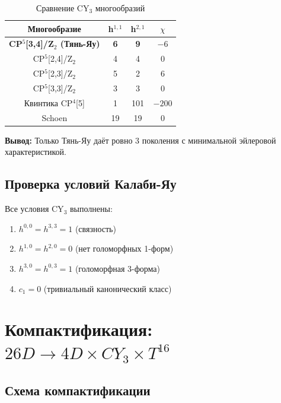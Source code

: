 \documentclass[12pt,a4paper,twoside]{article}
\newcommand{\checkmarkgreen}{\textcolor{emerald}{\checkmark}}
\theoremstyle{definition}
\begin{document}
\begin{table}[H]
\centering
\small
\caption{Сравнение CY$_3$ многообразий}
\label{tab:cy3_comparison}
\begin{tabular}{c|c|c|c}
\toprule
\textbf{Многообразие} & \textbf{h$^{1,1}$} & \textbf{h$^{2,1}$} & \textbf{$\chi$} \\
\midrule
\textbf{CP$^5$[3,4]/Z$_2$ (Тянь-Яу)} & \textbf{6} & \textbf{9} & \textbf{$-6$} \\
CP$^5$[2,4]/Z$_2$ & 4 & 4 & 0 \\
CP$^5$[2,3]/Z$_2$ & 5 & 2 & 6 \\
CP$^5$[3,3]/Z$_2$ & 3 & 3 & 0 \\
Квинтика CP$^4$[5] & 1 & 101 & $-200$ \\
Schoen & 19 & 19 & 0 \\
\bottomrule
\end{tabular}
\end{table}

\textbf{Вывод:} Только Тянь-Яу даёт ровно 3 поколения с минимальной эйлеровой характеристикой.

\subsection{Проверка условий Калаби-Яу}

Все условия CY$_3$ выполнены:
\begin{enumerate}
    \item $h^{0,0} = h^{3,3} = 1$ (связность) \checkmarkgreen
    \item $h^{1,0} = h^{2,0} = 0$ (нет голоморфных 1-форм) \checkmarkgreen
    \item $h^{3,0} = h^{0,3} = 1$ (голоморфная 3-форма) \checkmarkgreen
    \item $c_1 = 0$ (тривиальный канонический класс) \checkmarkgreen
\end{enumerate}

\section{Компактификация: \texorpdfstring{$26D \to 4D \times CY_3 \times T^{16}$}{26D -> 4D x CY3 x T16}}
\label{sec:compactification}

\subsection{Схема компактификации}
\end{document}
